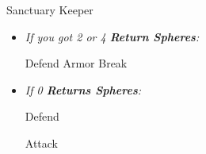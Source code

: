 \begin{battle}[40000]{Sanctuary Keeper}
    \begin{itemize}
        \item \textit{If you got 2 or 4 \textbf{Return Spheres}:}
        \begin{itemize}
            \yunaf Defend
            \tidusf Armor Break
        \end{itemize}
        \item \textit{If 0 \textbf{Returns Spheres}:}
        \begin{itemize}
            \tidusf Defend
        \end{itemize}
        \summon{\bahamut}
        \bahamutf Attack
    \end{itemize}
\end{battle}
\winnpsingle\lossnpsingle
